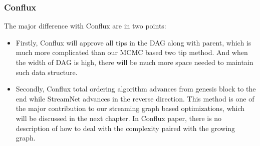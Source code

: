 \subsubsection{Conflux}
The major difference with Conflux are in two points:
\begin{itemize}
    \item Firstly, Conflux will approve all tips in the DAG along with parent, which is much more complicated than our MCMC based two tip method. 
        And when the width of DAG is high, there will be much more space needed to maintain such data structure. 
    \item Secondly, Conflux total ordering algorithm advances from genesis block to the end while StreamNet advances in the reverse direction. 
        This method is one of the major contribution to our streaming graph based optimizations,
        which will be discussed in the next chapter. 
        In Conflux paper, there is no description of how to deal with the complexity paired with the growing graph.
\end{itemize}
